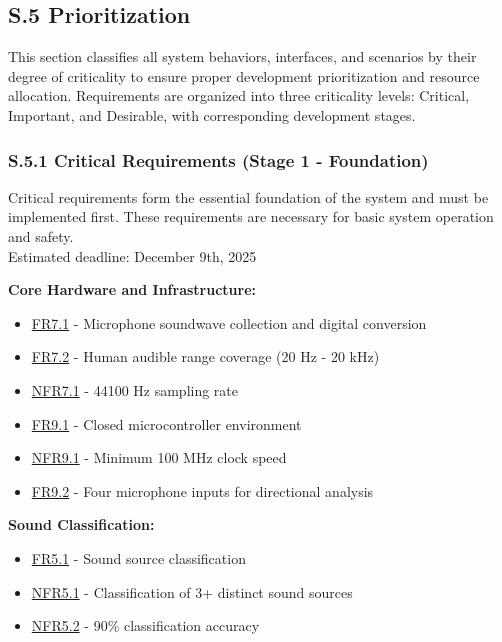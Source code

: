 \documentclass[12pt]{article}
\theoremstyle{definition}
\begin{document}
\subsection{S.5 Prioritization}

This section classifies all system behaviors, interfaces, and scenarios by their
degree of criticality to ensure proper development prioritization and resource
allocation. Requirements are organized into three criticality levels: Critical,
Important, and Desirable, with corresponding development stages.

\subsubsection{S.5.1 Critical Requirements (Stage 1 - Foundation)}

Critical requirements form the essential foundation of the system and must be
implemented first. These requirements are necessary for basic system operation
and safety. \\
\newline
Estimated deadline: December 9th, 2025 \\
\newline

\textbf{Core Hardware and Infrastructure:}
\begin{itemize}
    \item \hyperref[FR7_1]{FR7.1} - Microphone soundwave collection and digital
    conversion
    \item \hyperref[FR7_2]{FR7.2} - Human audible range coverage (20 Hz - 20
    kHz)
    \item \hyperref[NFR7_1]{NFR7.1} - 44100 Hz sampling rate
    \item \hyperref[FR9_1]{FR9.1} - Closed microcontroller environment
    \item \hyperref[NFR9_1]{NFR9.1} - Minimum 100 MHz clock speed
    \item \hyperref[FR9_2]{FR9.2} - Four microphone inputs for directional
    analysis
\end{itemize}

\textbf{Sound Classification:}
\begin{itemize}
    \item \hyperref[FR5_1]{FR5.1} - Sound source classification
    \item \hyperref[NFR5_1]{NFR5.1} - Classification of 3+ distinct sound
    sources
    \item \hyperref[NFR5_2]{NFR5.2} - 90\% classification accuracy
\end{itemize}
\end{document}
